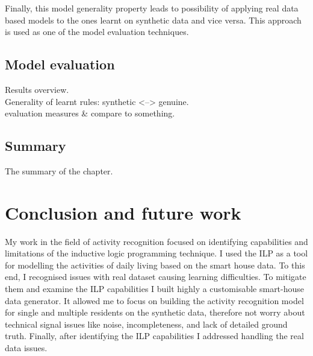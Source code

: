 \documentclass[10pt, a4paper, pdflatex, leqno, twoside, openright]{report}
\begin{document}
Finally, this model generality property leads to possibility of applying real data based models to the ones learnt on synthetic data and vice versa. This approach is used as one of the model evaluation techniques.

  \section{Model evaluation}
Results overview.\\
Generality of learnt rules: synthetic <--> genuine.\\
evaluation measures \& compare to something.\\

  \section{Summary}
The summary of the chapter.

\chapter{Conclusion and future work\label{ch:summary}}
My work in the field of activity recognition focused on identifying capabilities and limitations of the inductive logic programming technique. I used the ILP as a tool for modelling the activities of daily living based on the smart house data. To this end, I recognised issues with real dataset causing learning difficulties. To mitigate them and examine the ILP capabilities I built highly a customisable smart-house data generator. It allowed me to focus on building the activity recognition model for single and multiple residents on the synthetic data, therefore not worry about technical signal issues like noise, incompleteness, and lack of detailed ground truth. Finally, after identifying the ILP capabilities I addressed handling the real data issues.
\end{document}

